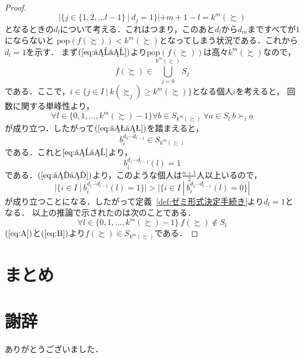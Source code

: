 \documentclass[dvipdfmx]{jsarticle}
\begin{document}
\begin{proof}
  \begin{equation}\label{eq:ええ}
    |\{ j \in \{1,2,\ldots l-1\} \ | \ d_j=1 \}| + m + 1 - l = k^m(\succsim)
  \end{equation}
  となるときの$d_l$について考える．これはつまり，このあと$d_l$から$d_m$まですべてが$1$にならないと
  $\mathrm{pop}(f(\succsim)) < k^m(\succsim)$となってしまう状況である．これから$d_l=1$を示す．
  まず$(\ref{eq:ええ})$より$\mathrm{pop}(f(\succsim))$は高々$k^m(\succsim)$なので，
  \begin{equation}\label{eq:おお}
    f(\succsim) \in \bigcup_{j=0}^{k^m(\succsim)}S_j
  \end{equation}
  である．ここで，$i \in \{j \in I \ | \ k(\succsim_j) \geq k^m(\succsim) \}$となる個人$i$を考えると，
  回数に関する単峰性より，
  \begin{equation*}
    \forall l \in \{0,1,\ldots, k^m(\succsim)-1\} \forall b \in S_{k^m(\succsim)} \ 
    \forall a \in S_l \ b \succ_i a
  \end{equation*}
  が成り立つ．したがって$(\ref{eq:おお})$を踏まえると，
  \begin{equation*}
    b_i^{d_{1}\cdots d_{l-1}} \in S_{k^m(\succsim)}
  \end{equation*}
  である．これと$\ref{eq:ええ}$より，
  \begin{equation*}
    b_i^{d_{1}\cdots d_{l-1}}(l) = 1
  \end{equation*}
  である．$(\ref{eq:いい})$より，このような個人は$\frac{n+1}{2}$人以上いるので，
  \begin{equation*}
    |\{i \in I \ | \ b_{i}^{d_{1}\cdots d_{l-1}}(l) = 1 \}| >
    |\{i \in I \ | \ b_{i}^{d_{1}\cdots d_{l-1}}(l) = 0 \}|
  \end{equation*}
  が成り立つことになる．したがって定義~\ref{def:ゼミ形式決定手続き}より$d_l=1$となる．
  以上の推論で示されたのは次のことである．
  \begin{equation}\label{eq:B}
    \forall l \in \{0,1,\ldots, k^m(\succsim)-1\} \ f(\succsim) \notin S_l
  \end{equation}
  $(\ref{eq:A})$と$(\ref{eq:B})$より$f(\succsim) \in S_{k^m(\succsim)}$である．
\end{proof}

\section{まとめ}

\section*{謝辞}
ありがとうございました．
\end{document}
